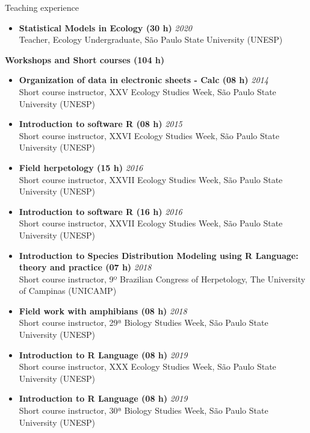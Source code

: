 \documentclass{resume}
\begin{document}
\begin{rSection}{Teaching experience}
\begin{itemize}
\item {\bf Statistical Models in Ecology (30 h)} \hfill{\em 2020}\\
Teacher, Ecology Undergraduate, São Paulo State University (UNESP)

\end{itemize}

{\bf Workshops and Short courses (104 h)}
\begin{itemize}
\item {\bf Organization of data in electronic sheets - Calc (08 h)} \hfill{\em 2014}\\
Short course instructor, XXV Ecology Studies Week, São Paulo State University (UNESP) 

\item {\bf Introduction to software R (08 h)} \hfill{\em 2015}\\
Short course instructor, XXVI Ecology Studies Week, São Paulo State University (UNESP) 

\item {\bf Field herpetology (15 h)} \hfill{\em 2016}\\
Short course instructor, XXVII Ecology Studies Week, São Paulo State University (UNESP) 

\item {\bf Introduction to software R (16 h)} \hfill{\em 2016}\\
Short course instructor, XXVII Ecology Studies Week, São Paulo State University (UNESP) 

\item {\bf Introduction to Species Distribution Modeling using R Language: theory and practice (07 h)} \hfill{\em 2018}\\
Short course instructor, 9º Brazilian Congress of Herpetology, The University of Campinas (UNICAMP)

\item {\bf Field work with amphibians (08 h)} \hfill{\em 2018}\\
Short course instructor, 29ª Biology Studies Week, São Paulo State University (UNESP) 

\item {\bf Introduction to R Language (08 h)} \hfill{\em 2019}\\
Short course instructor, XXX Ecology Studies Week, São Paulo State University (UNESP) 

\item {\bf Introduction to R Language (08 h)} \hfill{\em 2019}\\
Short course instructor, 30ª Biology Studies Week, São Paulo State University (UNESP)


\end{itemize}
\end{rSection}
\end{document}
